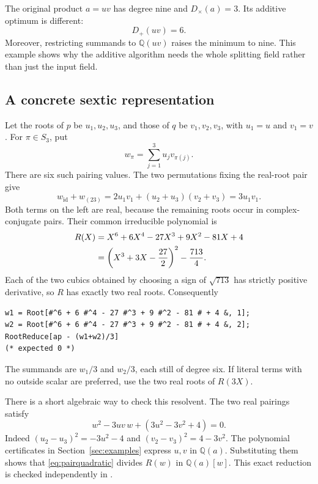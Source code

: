 \documentclass[11pt,a4paper]{article}
\theoremstyle{definition}\newtheorem{definition}[theorem]{Definition}
\theoremstyle{remark}\newtheorem{remark}[theorem]{Remark}
\newcommand{\Q}{\mathbb Q}
\newcommand{\Dplus}{D_{+}}
\newcommand{\Dtimes}{D_{\times}}
\newcommand{\code}[1]{\texttt{\detokenize{#1}}}
\begin{document}
The original product $a=uv$ has degree nine and $\Dtimes(a)=3$. Its
additive optimum is different:
\begin{equation}
 \boxed{\Dplus(uv)=6.}
 \label{eq:sexticopt}
\end{equation}
Moreover, restricting summands to $\Q(uv)$ raises the minimum to nine.
This example shows why the additive algorithm needs the whole splitting
field rather than just the input field.

\subsection{A concrete sextic representation}

Let the roots of $p$ be $u_1,u_2,u_3$, and those of $q$ be
$v_1,v_2,v_3$, with $u_1=u$ and $v_1=v$. For $\pi\in S_3$, put
\[
 w_\pi=\sum_{j=1}^{3}u_jv_{\pi(j)}.
\]
There are six such pairing values. The two permutations fixing the real-root
pair give
\[
 w_{\mathrm{id}}+w_{(23)}
 =2u_1v_1+(u_2+u_3)(v_2+v_3)=3u_1v_1.
\]
Both terms on the left are real, because the remaining roots occur in
complex-conjugate pairs. Their common irreducible polynomial is
\begin{align}
 R(X)&=X^6+6X^4-27X^3+9X^2-81X+4\label{eq:sextic}\\
 &=\left(X^3+3X-\frac{27}{2}\right)^2-\frac{713}{4}.\notag
\end{align}
Each of the two cubics obtained by choosing a sign of $\sqrt{713}$ has
strictly positive derivative, so $R$ has exactly two real roots. Consequently
\begin{lstlisting}
w1 = Root[#^6 + 6 #^4 - 27 #^3 + 9 #^2 - 81 # + 4 &, 1];
w2 = Root[#^6 + 6 #^4 - 27 #^3 + 9 #^2 - 81 # + 4 &, 2];
RootReduce[ap - (w1+w2)/3]
(* expected 0 *)
\end{lstlisting}
The summands are $w_1/3$ and $w_2/3$, each still of degree six. If literal
\code{Root} terms with no outside scalar are preferred, use the two real
roots of $R(3X)$.

There is a short algebraic way to check this resolvent. The two real
pairings satisfy
\begin{equation}
 w^2-3uv\,w+(3u^2-3v^2+4)=0.
 \label{eq:pairquadratic}
\end{equation}
Indeed
$(u_2-u_3)^2=-3u^2-4$ and $(v_2-v_3)^2=4-3v^2$.
The polynomial certificates in Section~\ref{sec:examples} express $u,v$
in $\Q(a)$. Substituting them shows that \eqref{eq:pairquadratic} divides
$R(w)$ in $\Q(a)[w]$. This exact reduction is checked independently in
\code{verification/verify.py}.
\end{document}

